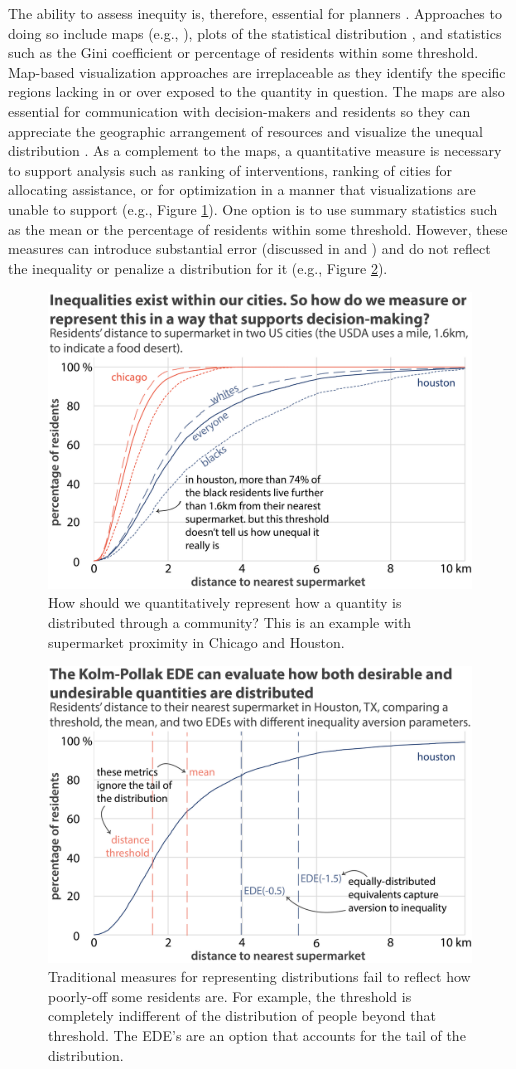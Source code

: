 \documentclass[final,3p,times,onecolumn,sort&compress]{elsarticle}
\begin{document}
The ability to assess inequity is, therefore, essential for planners \citep{Talen1998-fl}.
Approaches to doing so include maps (e.g., \cite{Talen1998-fl}), plots of the statistical distribution \citep{Logan2019-fr}, and statistics such as the Gini coefficient or percentage of residents within some threshold. 
Map-based visualization approaches are irreplaceable as they identify the specific regions lacking in or over exposed to the quantity in question. 
The maps are also essential for communication with decision-makers and residents so they can appreciate the geographic arrangement of resources and visualize the unequal distribution \citep{Talen1998-fl}.
As a complement to the maps, a quantitative measure is necessary to support analysis such as ranking of interventions, ranking of cities for allocating assistance, or for optimization in a manner that visualizations are unable to support (e.g., Figure \ref{fig:the_challenge}).
One option is to use summary statistics such as the mean or the percentage of residents within some threshold.
However, these measures can introduce substantial error (discussed in \cite{Kolak2018-az} and \cite{Logan2019-fr}) and do not reflect the inequality or penalize a distribution for it (e.g., Figure \ref{fig:problem_with_existing}).

\begin{figure}[h]
    \centering
    \includegraphics[width=0.5\linewidth]{report/fig/fig1.png}
    \caption{
    How should we quantitatively represent how a quantity is distributed through a community? This is an example with supermarket proximity in Chicago and Houston.
    }
    \label{fig:the_challenge}
\end{figure}

\begin{figure}[h]
    \centering
    \includegraphics[width=0.5\linewidth]{report/fig/fig1b.png}
    \caption{
    Traditional measures for representing distributions fail to reflect how poorly-off some residents are. For example, the threshold is completely indifferent of the distribution of people beyond that threshold. 
    The EDE's are an option that accounts for the tail of the distribution.
    }
    \label{fig:problem_with_existing}
\end{figure}
\end{document}

